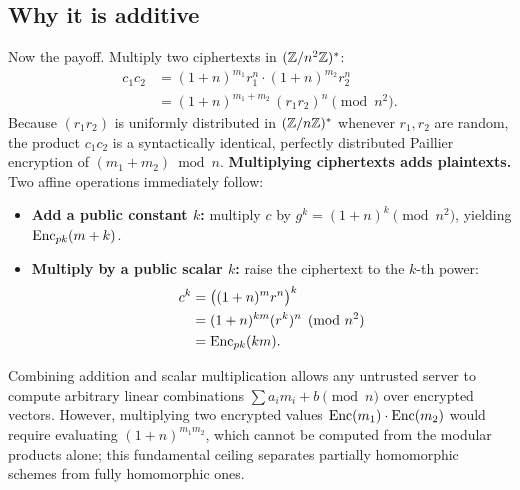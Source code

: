 \subsection{Why it is additive}
\label{ch33:paillier-additive}

Now the payoff. Multiply two ciphertexts in $(\mathbb{Z}/n^2\mathbb{Z})^{*}$:
\begin{align*}
  c_1 c_2 &= (1+n)^{m_1} r_1^n \cdot (1+n)^{m_2} r_2^n \\
  &= (1+n)^{m_1+m_2}\,(r_1 r_2)^n \pmod{n^2} .
\end{align*}
Because $(r_1 r_2)$ is uniformly distributed in $(\mathbb{Z}/n\mathbb{Z})^{*}$ whenever $r_1, r_2$ are random, the product $c_1 c_2$ is a syntactically identical, perfectly distributed Paillier encryption of $(m_1 + m_2) \bmod n$. \textbf{Multiplying ciphertexts adds plaintexts.} Two affine operations immediately follow:
\begin{itemize}
  \item \textbf{Add a public constant $k$:} multiply $c$ by $g^k = (1+n)^k \pmod{n^2}$, yielding $\operatorname{Enc}_{pk}(m + k)$.
  \item \textbf{Multiply by a public scalar $k$:} raise the ciphertext to the $k$-th power:
  \begin{align*}
    c^k &= \bigl((1+n)^m r^n\bigr)^k \\
    &= (1+n)^{k m} (r^k)^n \pmod{n^2} \\
    &= \operatorname{Enc}_{pk}(k m).
  \end{align*}
\end{itemize}
Combining addition and scalar multiplication allows any untrusted server to compute arbitrary linear combinations $\sum a_i m_i + b \pmod n$ over encrypted vectors. However, multiplying two encrypted values $\operatorname{Enc}(m_1) \cdot \operatorname{Enc}(m_2)$ would require evaluating $(1+n)^{m_1 m_2}$, which cannot be computed from the modular products alone; this fundamental ceiling separates partially homomorphic schemes from fully homomorphic ones.

